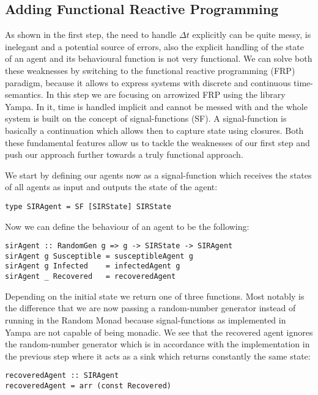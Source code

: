 \subsection{Adding Functional Reactive Programming}
As shown in the first step, the need to handle $\Delta t$ explicitly can be quite messy, is inelegant and a potential source of errors, also the explicit handling of the state of an agent and its behavioural function is not very functional. We can solve both these weaknesses by switching to the functional reactive programming (FRP) paradigm, because it allows to express systems with discrete and continuous time-semantics. In this step we are focusing on arrowized FRP using the library Yampa. In it, time is handled implicit and cannot be messed with and the whole system is built on the concept of signal-functions (SF). A signal-function is basically a continuation which allows then to capture state using closures. Both these fundamental features allow us to tackle the weaknesses of our first step and push our approach further towards a truly functional approach.

We start by defining our agents now as a signal-function which receives the states of all agents as input and outputs the state of the agent:

\begin{verbatim}
type SIRAgent = SF [SIRState] SIRState 
\end{verbatim}

Now we can define the behaviour of an agent to be the following:

\begin{verbatim}
sirAgent :: RandomGen g => g -> SIRState -> SIRAgent
sirAgent g Susceptible = susceptibleAgent g
sirAgent g Infected    = infectedAgent g
sirAgent _ Recovered   = recoveredAgent
\end{verbatim}

Depending on the initial state we return one of three functions. Most notably is the difference that we are now passing a random-number generator instead of running in the Random Monad because signal-functions as implemented in Yampa are not capable of being monadic. We see that the recovered agent ignores the random-number generator which is in accordance with the implementation in the previous step where it acts as a sink which returns constantly the same state:

\begin{verbatim}
recoveredAgent :: SIRAgent
recoveredAgent = arr (const Recovered)
\end{verbatim}

